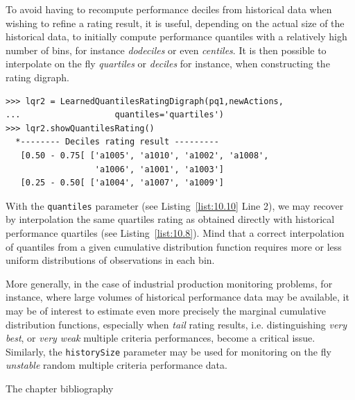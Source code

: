 To avoid having to recompute performance deciles from historical data when wishing to refine a rating result, it is useful, depending on the actual size of the historical data, to initially compute performance quantiles with a relatively high number of bins, for instance \emph{dodeciles} or even \emph{centiles}. It is then possible to interpolate on the fly \emph{quartiles} or \emph{deciles} for instance, when constructing the rating digraph. 
\begin{lstlisting}[caption={From deciles interpolated quartiles rating result},label=list:10.10]
>>> lqr2 = LearnedQuantilesRatingDigraph(pq1,newActions,
...                   quantiles='quartiles')
>>> lqr2.showQuantilesRating()
  *-------- Deciles rating result ---------
   [0.50 - 0.75[ ['a1005', 'a1010', 'a1002', 'a1008',
                  'a1006', 'a1001', 'a1003']
   [0.25 - 0.50[ ['a1004', 'a1007', 'a1009']
\end{lstlisting}
With the \texttt{quantiles} parameter (see Listing~\ref{list:10.10} Line 2), we may recover by interpolation the same quartiles rating as obtained directly with historical performance quartiles (see Listing~\ref{list:10.8}). Mind that a correct interpolation of quantiles from a given cumulative distribution function requires more or less uniform distributions of observations in each bin. 

More generally, in the case of industrial production monitoring problems, for instance, where large volumes of historical performance data may be available, it may be of interest to estimate even more precisely the marginal cumulative distribution functions, especially when \emph{tail} rating results, i.e. distinguishing \emph{very best}, or \emph{very weak} multiple criteria performances, become a critical issue. Similarly, the \texttt{historySize} parameter may be used for monitoring on the fly \emph{unstable} random multiple criteria performance data.  	

The chapter bibliography
\clearpage


% 
